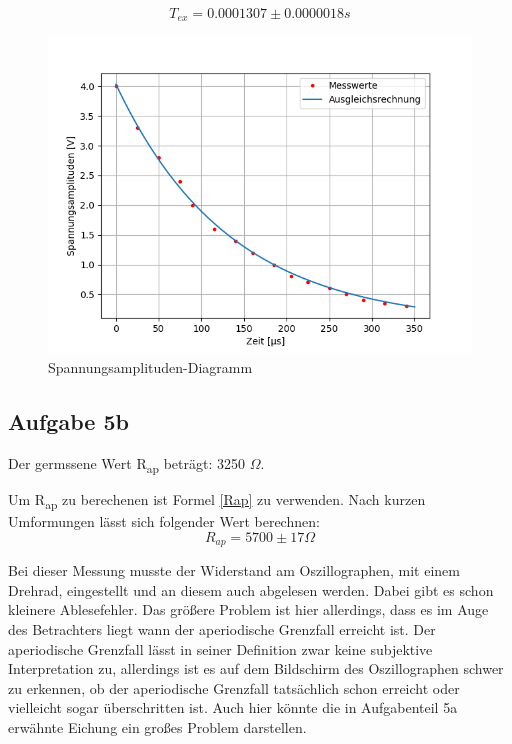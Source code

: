 \documentclass[titlepage=firstcover, captions=tableheading]{scrartcl}
\begin{document}
\begin{displaymath}
    T_{ex} = 0.0001307 \pm 0.0000018 s
\end{displaymath}

\begin{figure}[H]
    \includegraphics{5a.png}
    \caption{Spannungsamplituden-Diagramm}
    \label{5aD}
\end{figure}

\subsection{Aufgabe 5b}

Der germssene Wert R\textsubscript{ap} beträgt: 3250 $\Omega$.

\noindent Um R\textsubscript{ap} zu berechenen ist Formel \ref{Rap} zu verwenden.
Nach kurzen Umformungen lässt sich folgender Wert berechnen:
\begin{displaymath}
   R_{ap} = 5700 \pm 17 \Omega
\end{displaymath} 

\noindent Bei dieser Messung musste der Widerstand am Oszillographen, mit einem Drehrad, eingestellt und an diesem auch abgelesen werden.
Dabei gibt es schon kleinere Ablesefehler.
Das größere Problem ist hier allerdings, dass es im Auge des Betrachters liegt wann der aperiodische Grenzfall erreicht ist.
Der aperiodische Grenzfall lässt in seiner Definition zwar keine subjektive Interpretation zu, 
allerdings ist es auf dem Bildschirm des Oszillographen schwer zu erkennen, 
ob der aperiodische Grenzfall tatsächlich schon erreicht oder vielleicht sogar überschritten ist. 
Auch hier könnte die in Aufgabenteil 5a erwähnte Eichung ein großes Problem darstellen.
\end{document}
